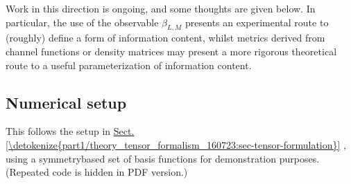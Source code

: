 \documentclass[letterpaper,table,10pt,english]{jupyterBook}
\begin{document}
\sphinxAtStartPar
Work in this direction is ongoing, and some thoughts are given below. In particular, the use of the observable \(\beta_{L,M}\) presents an experimental route to (roughly) define a form of information content, whilst metrics derived from channel functions or density matrices may present a more rigorous theoretical route to a useful parameterization of information content.


\subsection{Numerical setup}
\label{\detokenize{part1/theory_info_content_200723:numerical-setup}}
\sphinxAtStartPar
This follows the setup in \hyperref[\detokenize{part1/theory_tensor_formalism_160723:sec-tensor-formulation}]{Sect.\@ \ref{\detokenize{part1/theory_tensor_formalism_160723:sec-tensor-formulation}}} {\hyperref[\detokenize{part1/theory_tensor_formalism_160723:sec-tensor-formulation}]{}}, using a symmetry\sphinxhyphen{}based set of basis functions for demonstration purposes. (Repeated code is hidden in PDF version.)
\end{document}
